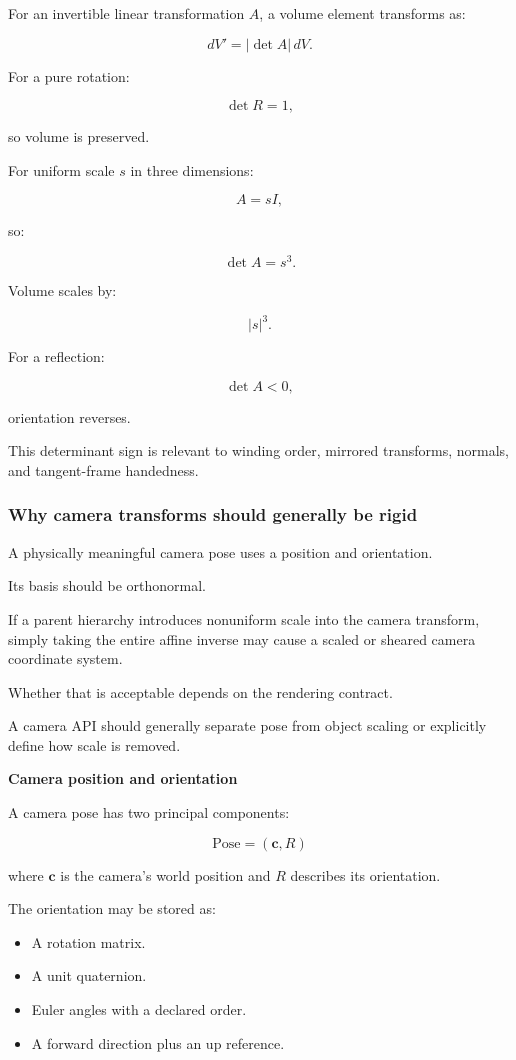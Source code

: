 For an invertible linear transformation \(A\), a volume element transforms as:

\[
 \boxed{ dV'=|\det A|\,dV }.
\]

For a pure rotation:

\[
 \det R=1,
\]

so volume is preserved.

For uniform scale \(s\) in three dimensions:

\[
 A=sI,
\]

so:

\[
 \det A=s^3.
\]

Volume scales by:

\[
 |s|^3.
\]

For a reflection:

\[
 \det A<0,
\]

orientation reverses.

This determinant sign is relevant to winding order, mirrored transforms, normals, and tangent-frame handedness.

\subsubsection{Why camera transforms should generally be rigid}\label{02-foundations-ii-ch032-why-camera-transforms-should-generally-be-rigid}

A physically meaningful camera pose uses a position and orientation.

Its basis should be orthonormal.

If a parent hierarchy introduces nonuniform scale into the camera transform, simply taking the entire affine inverse may cause a scaled or sheared camera coordinate system.

Whether that is acceptable depends on the rendering contract.

A camera API should generally separate pose from object scaling or explicitly define how scale is removed.

\textbf{Camera position and orientation}

A camera pose has two principal components:

\[
 \boxed{ \text{Pose}=(\mathbf c,R) }
\]

where \(\mathbf c\) is the camera's world position and \(R\) describes its orientation.

The orientation may be stored as:

\begin{itemize}
\tightlist
\item
  A rotation matrix.
\item
  A unit quaternion.
\item
  Euler angles with a declared order.
\item
  A forward direction plus an up reference.
\end{itemize}

